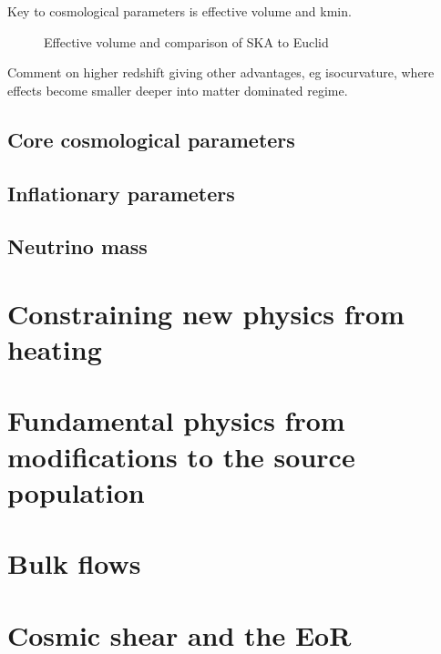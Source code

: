 \documentclass{PoS}
\begin{document}
Key to cosmological parameters is effective volume and kmin.

\begin{figure}[htbp]
\begin{center}

\caption{Effective volume and comparison of SKA to Euclid}
\label{fig:effectivevolume}
\end{center}
\end{figure}

Comment on higher redshift giving other advantages, eg isocurvature, where effects become smaller deeper into matter dominated regime.


\subsection{Core cosmological parameters}

\subsection{Inflationary parameters}

\subsection{Neutrino mass}



\section{Constraining new physics from heating}

\section{Fundamental physics from modifications to the source population}

\section{Bulk flows}

\section{Cosmic shear and the EoR}
\end{document}
